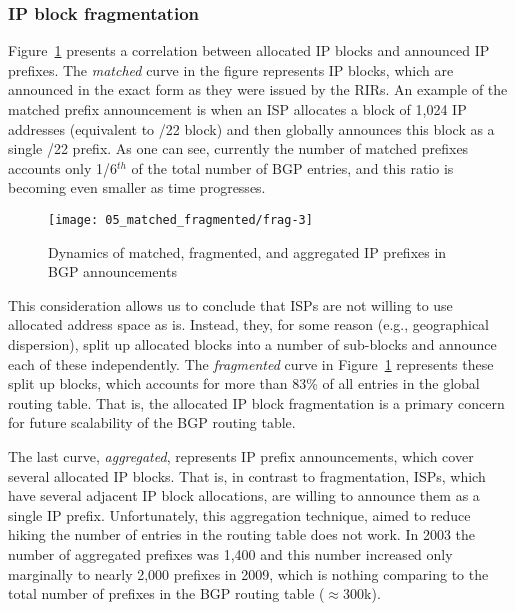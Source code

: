 \subsubsection{IP block fragmentation}

Figure~\ref{fig:fragmentation} presents a correlation between allocated IP
blocks and announced IP prefixes. The \emph{matched} curve in the figure
represents IP blocks, which are announced in the exact form as they were
issued by the RIRs. An example of the matched prefix announcement is when an
ISP allocates a block of 1,024 IP addresses (equivalent to /22 block) and then
globally announces this block as a single /22 prefix. As one can see,
currently the number of matched prefixes accounts only 1/6$^{th}$ of the total
number of BGP entries, and this ratio is becoming even smaller as time
progresses.

\begin{figure}[htbp]
	\centering
		\texttt{[image: 05\_matched\_fragmented/frag-3]}
	\caption{Dynamics of matched, fragmented, and aggregated IP prefixes in BGP announcements}
	\label{fig:fragmentation}
\end{figure}

This consideration allows us to conclude that ISPs are not willing to use
allocated address space as is. Instead, they, for some reason (e.g.,
geographical dispersion), split up allocated blocks into a number of
sub-blocks and announce each of these independently. The \emph{fragmented}
curve in Figure~\ref{fig:fragmentation} represents these split up blocks,
which accounts for more than 83\% of all entries in the global routing table.
That is, the allocated IP block fragmentation is a primary concern for
future scalability of the BGP routing table.

The last curve, \emph{aggregated}, represents IP prefix announcements, which
cover several allocated IP blocks. That is, in contrast to fragmentation,
ISPs, which have several adjacent IP block allocations, are willing to
announce them as a single IP prefix. Unfortunately, this aggregation
technique, aimed to reduce hiking the number of entries in the routing table
does not work. In 2003 the number of aggregated prefixes was 1,400 and this
number increased only marginally to nearly 2,000 prefixes in 2009, which is
nothing comparing to the total number of prefixes in the BGP routing table
($\approx$300k).

